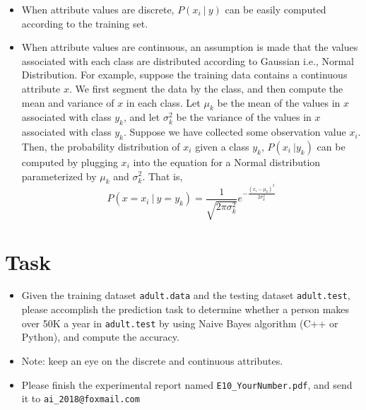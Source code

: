 ﻿\documentclass[a4paper, 11pt]{article}
\begin{document}
\begin{itemize}
	\item When attribute values are discrete, $P(x_i\ |\ y)$ can be easily computed according to the training set.
	\item When attribute values are continuous, an assumption is made that the values associated with each class are distributed according to Gaussian i.e., Normal Distribution. For example, suppose the training data contains a continuous attribute $x$. We first segment the data by the class, and then compute the mean and variance of $x$ in each class. Let $\mu_k$ be the mean of the values in $x$ associated with class $y_k$, and let $\sigma_k^2$ be the variance of the values in $x$ associated with class $y_k$. Suppose we have collected some observation value $x_i$. Then, the probability distribution of $x_i$ given a class $y_k$, $P(x_i\ | y_k)$ can be computed by plugging $x_i$ into the equation for a Normal distribution parameterized by $\mu_k$ and $\sigma_k^2$. That is,
	$$P(x=x_i\ |\ y=y_k)=\frac{1}{\sqrt{2\pi\sigma_k^2}}e^{-\frac{(x_i-\mu_k)^2}{2\sigma_k^2}}$$

\end{itemize}

\section{Task}
\begin{itemize}
\item Given the training dataset \texttt{adult.data} and the testing dataset \texttt{adult.test}, please accomplish the prediction task to determine whether a person makes over 50K a year in \texttt{adult.test} by using Naive Bayes algorithm (C++ or Python), and compute the accuracy.
\item Note: keep an eye on the discrete and continuous attributes.
\item Please finish the experimental report named \texttt{E10\_YourNumber.pdf}, and send it to \texttt{ai\_2018@foxmail.com}
\end{itemize}
\end{document}

